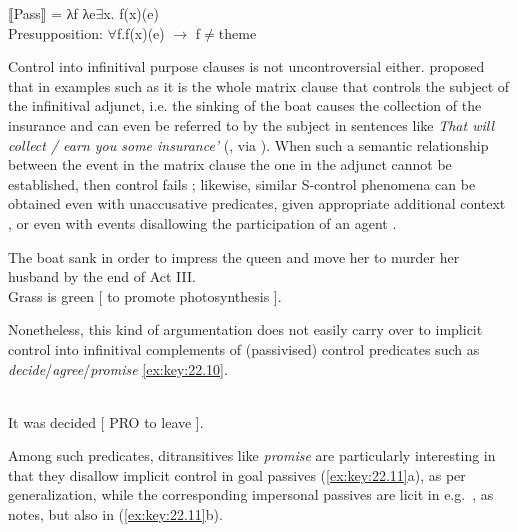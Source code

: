 \documentclass[output=paper]{langsci/langscibook}
\begin{document}
\ea\label{ex:key:22.6}
    ⟦Pass⟧ = λf λe${\exists}$x. f(x)(e)\\
    Presupposition: ${\forall}$f.f(x)(e) $\to$ f${\neq}$theme
\z

Control into infinitival purpose clauses is not uncontroversial either.
\citet{Williams1985} proposed that in examples such as  it is
the whole matrix clause that controls the subject of the infinitival adjunct,
i.e.  the sinking of the boat causes the collection of the insurance and can
even be referred to by the subject in sentences like \emph{That will collect /
earn you some insurance’} (\citealt{Williams1985}, via
\citealt[573]{BhattPancheva2006}). When such a semantic relationship between
the event in the matrix clause the one in the adjunct cannot be established,
then control fails ; likewise, similar S-control phenomena can
be obtained even with unaccusative predicates, given appropriate additional
context , or even with events disallowing the participation of
an agent .

\label{ex:key:22.7}
\z
\ea\label{ex:key:22.8} The boat sank in order to impress the queen and move her
to murder her husband by the end of Act III.
\z
\ea\label{ex:key:22.9} \textcite{Williams1985}\\
    Grass is green [ to promote photosynthesis ].
\z

Nonetheless, this kind of argumentation does not easily carry over to implicit
control into infinitival complements of (passivised) control predicates such as
\emph{decide}/\emph{agree}/\emph{promise} \eqref{ex:key:22.10}.

\ea\label{ex:key:22.10} \textcite[4]{Landau2010}\\
    It was decided [ PRO to leave ].
\z

Among such predicates, ditransitives like \emph{promise} are particularly
interesting in that they disallow implicit control in goal passives
(\ref{ex:key:22.11}a), as per  generalization, while the
corresponding impersonal passives are licit in e.g.\ , as
\citet{vanUrk2013} notes, but also in 
(\ref{ex:key:22.11}b).\newpage

\ea\label{ex:key:22.11} \textcite{PitteroffSchafer2017}
    \z
\z
\end{document}
